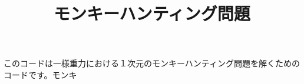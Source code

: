 \documentclass{jarticle}
\title{モンキーハンティング問題}
\begin{document}
このコードは一様重力における１次元のモンキーハンティング問題を解くためのコードです。モンキ
\end{document}

